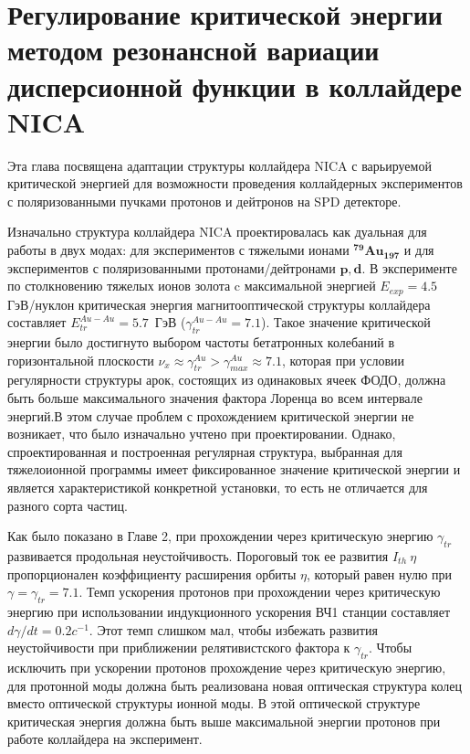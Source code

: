 
	\chapter{Регулирование критической энергии методом резонансной вариации дисперсионной функции в коллайдере NICA }\label{ch:transition_variation}

\par Эта глава посвящена адаптации структуры коллайдера NICA с варьируемой критической энергией для возможности проведения коллайдерных экспериментов с поляризованными пучками протонов и дейтронов на SPD детекторе.

\par Изначально структура коллайдера NICA проектировалась как дуальная для работы в двух модах: для экспериментов с тяжелыми ионами $^{\mathbf{79}}{\mathbf{Au}}_{\mathbf{197}}$ и для экспериментов с поляризованными протонами/дейтронами $\mathbf{p, d}$. В эксперименте по столкновению тяжелых ионов золота c максимальной энергией $E_{exp}=4.5$ ГэВ/нуклон критическая энергия магнитооптической структуры коллайдера составляет $E_{tr}^{Au-Au}=5.7$\ ГэВ ($\gamma_{tr}^{Au-Au}=7.1$). Такое значение критической энергии было достигнуто выбором частоты бетатронных колебаний в горизонтальной плоскости $\nu_x\approx\gamma_{tr}^{Au}>\gamma_{max}^{Au}\approx7.1$, которая  при условии регулярности структуры арок, состоящих из одинаковых ячеек ФОДО, должна быть больше максимального значения фактора Лоренца во всем интервале энергий.В этом случае проблем с прохождением критической энергии не возникает, что было изначально учтено при проектировании. Однако, спроектированная и построенная регулярная структура, выбранная для тяжелоионной программы имеет фиксированное значение критической энергии и является характеристикой конкретной установки, то есть не отличается для разного сорта частиц.

\par Как было показано в Главе 2, при прохождении через критическую энергию $\gamma_{tr}$ развивается продольная неустойчивость. Пороговый ток ее развития $I_{th}~\eta$ пропорционален коэффициенту расширения орбиты $\eta$, который равен нулю при  $\gamma=\gamma_{tr}=7.1$. Темп ускорения протонов при прохождении через критическую энергию при использовании индукционного ускорения ВЧ1 станции составляет $d\gamma/dt=0.2c^{-1}$. Этот темп слишком мал, чтобы избежать развития неустойчивости при приближении релятивистского фактора к $\gamma_{tr}$. Чтобы исключить при ускорении протонов прохождение через критическую энергию, для протонной моды должна быть реализована новая оптическая структура колец вместо оптической структуры ионной моды. В этой оптической структуре критическая энергия должна быть выше максимальной энергии протонов при работе коллайдера на эксперимент.

